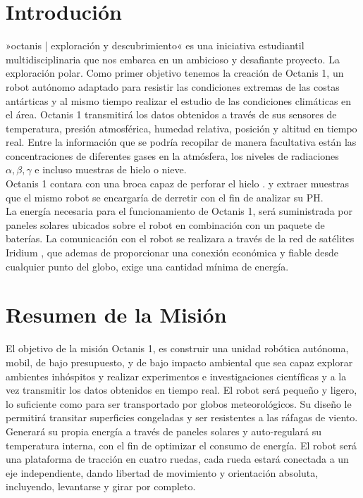 \documentclass[a4paper,12pt]{article}
\begin{document}
\tableofcontents

\pagebreak

\section{Introdución}
»octanis | exploración y descubrimiento« \cite{octanis} es una iniciativa estudiantil multidisciplinaria que nos embarca en un ambicioso y desafiante proyecto. La exploración polar. Como primer objetivo tenemos la creación de Octanis 1, un robot autónomo adaptado para resistir las condiciones extremas de las costas antárticas y al mismo tiempo realizar el estudio de las condiciones climáticas en el área. 
Octanis 1 transmitirá los datos obtenidos a través de sus sensores de temperatura, presión atmosférica, humedad relativa, posición y altitud en tiempo real.  Entre la información que se podría recopilar de manera facultativa están las concentraciones de diferentes gases en la atmósfera, los niveles de radiaciones $\alpha, \beta, \gamma$ e incluso muestras de hielo o nieve.  \\ Octanis 1 contara con una broca capaz de perforar el hielo \cite{krishnakant}. y extraer muestras que el mismo robot se encargaría de derretir con el fin de analizar su PH.
\\ La energía necesaria para el funcionamiento de Octanis 1, será suministrada por paneles solares ubicados sobre el robot en combinación con un paquete de baterías. La comunicación con el robot se realizara a través de la red de satélites Iridium  \cite{iridium}, que ademas de proporcionar una conexión económica y fiable desde cualquier punto del globo, exige una cantidad mínima de energía.


\section{Resumen de la Misión}

El objetivo de la misión Octanis 1, es construir una unidad robótica autónoma, mobil, de bajo presupuesto, y de bajo impacto ambiental que sea capaz explorar ambientes inhóspitos y realizar experimentos e investigaciones científicas y a la vez transmitir los datos obtenidos en tiempo real. El robot será pequeño y ligero, lo suficiente como para ser transportado por globos meteorológicos. Su diseño le permitirá transitar superficies congeladas y ser resistentes a las ráfagas de viento. Generará su propia energía a través de paneles solares y auto-regulará su temperatura interna, con el fin de optimizar el consumo de energía. El robot será una plataforma de tracción en cuatro ruedas, cada rueda estará conectada a un eje independiente, dando libertad de movimiento y orientación absoluta, incluyendo, levantarse y girar por completo.
\end{document}
